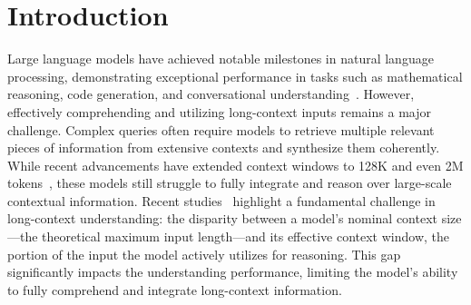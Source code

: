 \section{Introduction}




Large language models have achieved notable milestones in natural language processing, demonstrating exceptional performance in tasks such as mathematical reasoning, code generation, and conversational understanding~\cite{openai2023gpt4, deepseekai2025deepseekr1incentivizingreasoningcapability}. 
However, effectively comprehending and utilizing long-context inputs remains a major challenge. Complex queries often require models to retrieve multiple relevant pieces of information from extensive contexts and synthesize them coherently. While recent advancements have extended context windows to 128K and even 2M tokens~\cite{dubey2024llama3, touvron2023llama2, reid2024gemini}, these models still struggle to fully integrate and reason over large-scale contextual information. 
Recent studies~\cite{liu2024lost, prolong} highlight a fundamental challenge in long-context understanding: the disparity between a model’s nominal context size—the theoretical maximum input length—and its effective context window, the portion of the input the model actively utilizes for reasoning. This gap significantly impacts the understanding performance, limiting the model's ability to fully comprehend and integrate long-context information. 

